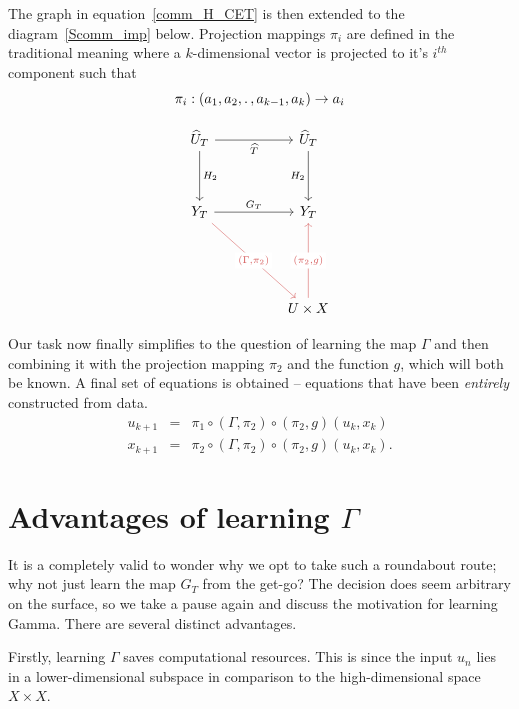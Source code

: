 The graph in equation~\ref{comm_H_CET} is then extended to the diagram~\ref{Scomm_imp} below.
Projection mappings $\pi_i$ are defined in the traditional meaning where a $k$-dimensional vector is projected to it's $i^{th}$ component such that \[\pi_i:(a_1,a_2, \ldotp, a_{k-1}, a_k)\to{a_i}\]

\begin{equation} \label{Scomm_imp}
\begin{tikzcd}
	{\widehat{U}_T} && {\widehat{U}_T} \\
	\\
	{Y_T} && {Y_T} \\
	\\
	\\
	&& {U\times X}
	\arrow["{\widehat{T}}"', from=1-1, to=1-3]
	\arrow["{H_2}", from=1-1, to=3-1]
	\arrow["{H_2}"', from=1-3, to=3-3]
	\arrow["{G_T}", from=3-1, to=3-3]
	\arrow["{(\Gamma, \pi_2)}"{description}, color={rgb,255:red,214;green,92;blue,92}, from=3-1, to=6-3]
	\arrow["{(\pi_2, g)}"{description}, color={rgb,255:red,214;green,92;blue,92}, from=6-3, to=3-3]
\end{tikzcd}
\end{equation}


Our task now finally simplifies to the question of learning the map $\Gamma$ and then combining it with the projection mapping $\pi_2$ and the function $g$, which will both be known. A final set of equations is obtained -- equations that have been \textit{entirely} constructed from data.
\begin{eqnarray}\label{eqns_from_data}
	u_{k+1} &=& \pi_1 \circ (\Gamma, \pi_2) \circ (\pi_2,g) (u_k,x_k) \label{Seqn_u}\\
	x_{k+1} &=& \pi_2 \circ (\Gamma, \pi_2) \circ (\pi_2,g) (u_k,x_k). \nonumber
	\label{Seqn_x}
\end{eqnarray}



\section{Advantages of learning $\Gamma$}\label{subs_LearnGamma}

It is a completely valid to wonder why we opt to take such a roundabout route; why not just learn the map $G_T$ from the get-go? The decision does seem arbitrary on the surface, so we take a pause again and discuss the motivation for learning Gamma.
There are several distinct advantages. 

Firstly, learning $\Gamma$ saves computational resources. This is since the input $u_n$ lies in a lower-dimensional subspace in comparison to the high-dimensional space $X\times{X}$. 

